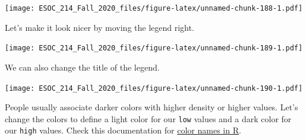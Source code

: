 \documentclass[
]{book}
\newenvironment{Shaded}{\begin{snugshade}}{\end{snugshade}}
\newcommand{\DataTypeTok}[1]{\textcolor[rgb]{0.13,0.29,0.53}{#1}}
\newcommand{\KeywordTok}[1]{\textcolor[rgb]{0.13,0.29,0.53}{\textbf{#1}}}
\newcommand{\NormalTok}[1]{#1}
\newcommand{\OperatorTok}[1]{\textcolor[rgb]{0.81,0.36,0.00}{\textbf{#1}}}
\newcommand{\StringTok}[1]{\textcolor[rgb]{0.31,0.60,0.02}{#1}}
\begin{document}
\texttt{[image: ESOC\_214\_Fall\_2020\_files/figure-latex/unnamed-chunk-188-1.pdf]}

Let's make it look nicer by moving the legend right.

\begin{Shaded}
\end{Shaded}

\texttt{[image: ESOC\_214\_Fall\_2020\_files/figure-latex/unnamed-chunk-189-1.pdf]}

We can also change the title of the legend.

\begin{Shaded}
\end{Shaded}

\texttt{[image: ESOC\_214\_Fall\_2020\_files/figure-latex/unnamed-chunk-190-1.pdf]}

People usually associate darker colors with higher density or higher values. Let's change the colors to define a light color for our \texttt{low} values and a dark color for our \texttt{high} values. Check this documentation for \href{http://www.stat.columbia.edu/~tzheng/files/Rcolor.pdf}{color names in R}.

\begin{Shaded}
\end{Shaded}
\end{document}
